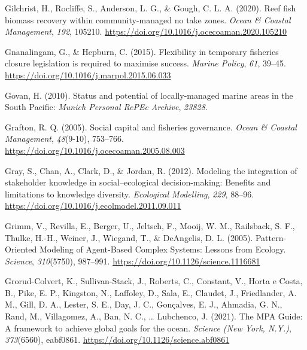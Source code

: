 \documentclass[
]{article}
\newlength{\cslhangindent}
\newlength{\cslentryspacingunit} %
\newenvironment{CSLReferences}[2] %
 {%
  \setlength{\parindent}{0pt}
  \ifodd #1
  \let\oldpar\par
  \def\par{\hangindent=\cslhangindent\oldpar}
  \fi
  \setlength{\parskip}{#2\cslentryspacingunit}
 }%
 {}
\begin{document}
\begin{CSLReferences}{1}{2}
\leavevmode{}%
Gilchrist, H., Rocliffe, S., Anderson, L. G., \& Gough, C. L. A. (2020). Reef fish biomass recovery within community-managed no take zones. \emph{Ocean \& Coastal Management}, \emph{192}, 105210. \url{https://doi.org/10.1016/j.ocecoaman.2020.105210}

\leavevmode{}%
Gnanalingam, G., \& Hepburn, C. (2015). Flexibility in temporary fisheries closure legislation is required to maximise success. \emph{Marine Policy}, \emph{61}, 39--45. \url{https://doi.org/10.1016/j.marpol.2015.06.033}

\leavevmode{}%
Govan, H. (2010). Status and potential of locally-managed marine areas in the {South} {Pacific}: \emph{Munich Personal RePEc Archive}, \emph{23828}.

\leavevmode{}%
Grafton, R. Q. (2005). Social capital and fisheries governance. \emph{Ocean \& Coastal Management}, \emph{48}(9-10), 753--766. \url{https://doi.org/10.1016/j.ocecoaman.2005.08.003}

\leavevmode{}%
Gray, S., Chan, A., Clark, D., \& Jordan, R. (2012). Modeling the integration of stakeholder knowledge in social--ecological decision-making: {Benefits} and limitations to knowledge diversity. \emph{Ecological Modelling}, \emph{229}, 88--96. \url{https://doi.org/10.1016/j.ecolmodel.2011.09.011}

\leavevmode{}%
Grimm, V., Revilla, E., Berger, U., Jeltsch, F., Mooij, W. M., Railsback, S. F., Thulke, H.-H., Weiner, J., Wiegand, T., \& DeAngelis, D. L. (2005). Pattern-{Oriented} {Modeling} of {Agent}-{Based} {Complex} {Systems}: {Lessons} from {Ecology}. \emph{Science}, \emph{310}(5750), 987--991. \url{https://doi.org/10.1126/science.1116681}

\leavevmode{}%
Grorud-Colvert, K., Sullivan-Stack, J., Roberts, C., Constant, V., Horta e Costa, B., Pike, E. P., Kingston, N., Laffoley, D., Sala, E., Claudet, J., Friedlander, A. M., Gill, D. A., Lester, S. E., Day, J. C., Gonçalves, E. J., Ahmadia, G. N., Rand, M., Villagomez, A., Ban, N. C., \ldots{} Lubchenco, J. (2021). The {MPA} {Guide}: {A} framework to achieve global goals for the ocean. \emph{Science (New York, N.Y.)}, \emph{373}(6560), eabf0861. \url{https://doi.org/10.1126/science.abf0861}


\end{CSLReferences}
\end{document}
